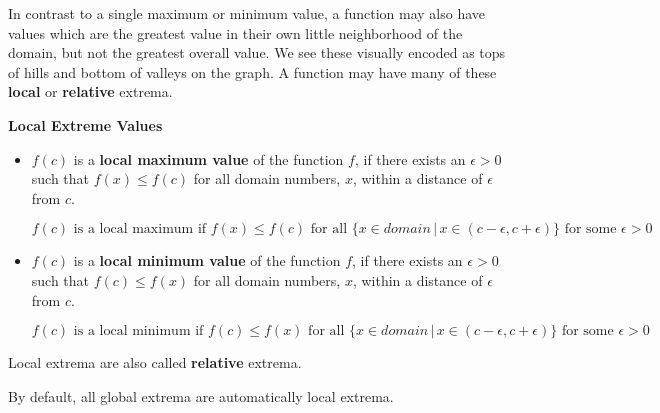 \documentclass{ximera}
\begin{document}
In contrast to a single maximum or minimum value, a function may also have values which are the greatest value in their own little neighborhood of the domain, but not the greatest overall value.  We see these visually encoded as tops of hills and bottom of valleys on the graph.  A function may have many of these \textbf{local} or \textbf{relative} extrema.






\begin{definition} \textbf{\textcolor{green!50!black}{Local Extreme Values}} 
\begin{itemize}
\item $f(c)$ is a \textbf{local maximum value} of the function $f$, if there exists an $\epsilon > 0$ such that $f(x) \leq f(c)$ for all domain numbers, $x$, within a distance of $\epsilon$ from $c$. 

\[  f(c) \text{ is a local maximum if } f(x) \leq f(c) \text{ for all } \{ x \in domain \, | \, x \in (c - \epsilon, c + \epsilon) \} \text{ for some } \epsilon > 0 \]







\item $f(c)$ is a \textbf{local minimum value} of the function $f$, if there exists an $\epsilon > 0$ such that $f(c) \leq f(x)$ for all domain numbers, $x$, within a distance of $\epsilon$ from $c$. 



\[  f(c) \text{ is a local minimum if } f(c) \leq f(x) \text{ for all } \{ x \in domain \, | \, x \in (c - \epsilon, c + \epsilon) \} \text{ for some } \epsilon > 0 \]
\end{itemize}

Local extrema are also called \textbf{relative} extrema.

\end{definition}





By default, all global extrema are automatically local extrema.
\end{document}
